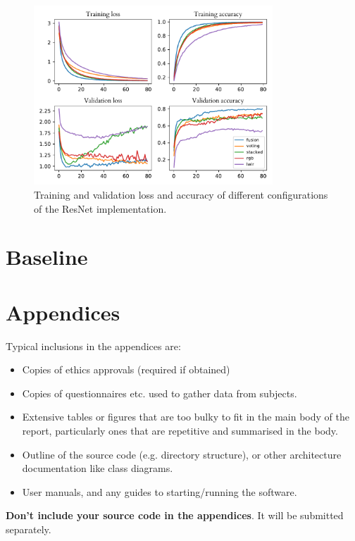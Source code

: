 \documentclass{l4proj}
\begin{document}
\begin{appendices}
\begin{figure}[ht]
  \centering
  \includegraphics[width=0.8\textwidth]{images/evaluation/gridsearch/ResNet}
  \caption{Training and validation loss and accuracy of different configurations of the ResNet implementation.}
  \label{fig:resnet_configs_app}
\end{figure}

\chapter{Baseline}
\label{appendix_baseline}


\chapter{Appendices}

Typical inclusions in the appendices are:

\begin{itemize}
\item
  Copies of ethics approvals (required if obtained)
\item
  Copies of questionnaires etc. used to gather data from subjects.
\item
  Extensive tables or figures that are too bulky to fit in the main body of
  the report, particularly ones that are repetitive and summarised in the body.

\item Outline of the source code (e.g. directory structure), or other architecture documentation like class diagrams.

\item User manuals, and any guides to starting/running the software.

\end{itemize}

\textbf{Don't include your source code in the appendices}. It will be
submitted separately.

\end{appendices}
\end{document}
